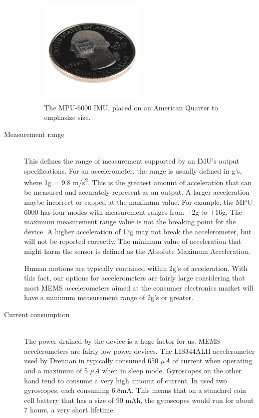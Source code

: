 \begin{description}
\begin{figure}
\begin{center}
\includegraphics[width=0.5\textwidth]{images/MPU6000Size.jpg}
\caption{The MPU-6000 IMU, placed on an American Quarter to emphasize size.}
\label{fig:MPU6000Size}
\end{center}
\end{figure}

\item[Measurement range] \hfill \\
This defines the range of measurement supported by an IMU's output specifications.
For an accelerometer, the range is usually defined in g's, where 1g = 9.8 m/s\textsuperscript{2}.
This is the greatest amount of acceleration that can be measured and accurately represent as an output.
A larger acceleration maybe incorrect or capped at the maximum value.
For example, the MPU-6000 has four modes with measurement ranges from $\pm{2}$g to $\pm{16}$g.
The maximum measurement range value is not the breaking point for the device.
A higher acceleration of 17g may not break the accelerometer, but will not be reported correctly.
The minimum value of acceleration that might harm the sensor is defined as the Absolute Maximum Acceleration.
 
Human motions are typically contained within 2g's of acceleration.
With this fact, our options for accelerometers are fairly large
considering that most MEMS accelerometers aimed at the consumer electronics market will have a minimum measurement range of 2g's or greater. 
\hfill 
\item[Current consumption] \hfill \\
The power drained by the device is a huge factor for us.
MEMS accelerometers are fairly low power devices.
The LIS344ALH accelerometer used by Drennan in \cite{drennan2010assessment} typically consumed 650 $\mu{A}$ of current when operating and a maximum of 5 $\mu{A}$ when in sleep mode.
Gyroscopes on the other hand tend to consume a very high amount of current.
In \cite{drennan2010assessment} used two gyroscopes, each consuming 6.8mA.
This means that on a standard coin cell battery that has a size of 90 mAh,
the gyroscopes would run for about 7 hours, a very short lifetime.


\end{description}
